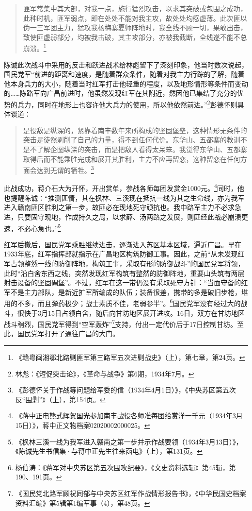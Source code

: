 \begin{quote}

匪军常集中其大部，对我一点，施行猛烈攻击，以求其突破或包围之成功，此种时机，匪军弱点，即在处处不能对我主攻，故处处均感虚薄。此次匪以伪一三军团主力，猛攻我杨梅寨夏师阵地时，我全线不顾一切，果敢出击，致使匪虚弱部分，均被我击破，其主攻部分，亦被我截断，全线遂不能不总崩溃。\footnote{《赣粤闽湘鄂北路剿匪军第三路军五次进剿战史》（上），第七章，第24页。}
\end{quote}


陈诚此次战斗中采用的反击和跃进战术给林彪留下了深刻印象，他当时数次说起，国民党军“前进的距离和速度，是随着群众条件，随着对我主力行踪的了解，随着他本身兵力的大小，随着当时红军打击他轻重的程度，以及地形情形等条件而变动的……陈路军向广昌前进时，他虽然发现红军在其附近，然因他已集结了充分的优势的兵力，同时在地形上也容许他大兵力的使用，所以他依然前进。”\footnote{林彪：《短促突击论》，《革命与战争》第6期，1934年7月。}彭德怀则具体谈道：

\begin{quote}

是役敌是纵深的，紧靠着南丰数年来所构成的坚固堡垒，这种情形无条件的突击是徒然剥削了自己的力量，得不到任何代价。东华山、五都寨的教训不是不了解企图纵深的突击，而是把敌人看得太呆笨。我觉得东华山、五都寨取得后而不能乘胜完成和展开其胜利，主力不应再留恋，这种留恋在任何方面会达到无谓的牺牲。\footnote{《彭德怀关于作战等问题给军委的信（1934年4月1日）》，《中央苏区第五次反“围剿”》（上），第154页。}
\end{quote}


此战成功，蒋介石大为开怀，开出赏单，参战各师每团发赏金1000元。\footnote{《蒋中正电熊式辉贺国光参加南丰战役各师准每团给赏洋一千元（1934年3月15日）》，蒋中正文物档案02020002000025。}同时，他也提醒陈诚：“推测匪情，其在枫林、三溪现在抵抗一线为其之生命线，亦为我军进入赣南匪区胜利之第一步，故匪必在现地死守顽抗也。我中路军主力不必求急进，只要固守现地，作成持久之局，以求薛、汤两路之发展，则匪经此战必崩溃更速，不必心急也。”\footnote{《枫林三溪一线为我军进入赣南之第一步并示作战要领（1934年3月13日）》，《陈诚先生书信集·与蒋中正先生往来函电》（上），第131页。}


红军后撤后，国民党军乘胜继续进击，逐渐进入苏区基本区域，逼近广昌。早在1933年底，红军指挥部就指示在广昌地区构筑防御工事。因此，之前“从未发现红军占领整然一线的防御阵地，构筑工事，采取有形的防御战斗”的国民党军将领，此时“沿白舍东西之线，突然发现红军构筑有整然的防御阵地，重要山头筑有两层射击设备的坚固碉堡”。不过，红军在这一带仍没有采取死守方针：“当面守备的红军不是主力部队，是新近扩军所编成的队伍；装备很差，携带的多是破旧步枪，堪用的不多，而且弹药极少；战士素质不佳，老弱参半”。\footnote{杨伯涛：《蒋军对中央苏区第五次围攻纪要》，《文史资料选辑》第45辑，第190、191页。}国民党军没有经过大的战斗，很快于3月15日占领白舍，随后向甘坊地区展开进攻。16日，双方在甘坊地区战斗稍烈，国民党军得到“空军轰炸”\footnote{《国民党北路军顾祝同部与中央苏区红军作战情形报告书》，《中华民国史档案资料汇编》第5辑第1编军事（4），第48页。}支持，付出一定代价后于17日控制甘坊。至此，国民党军打开了通往广昌的大门。


